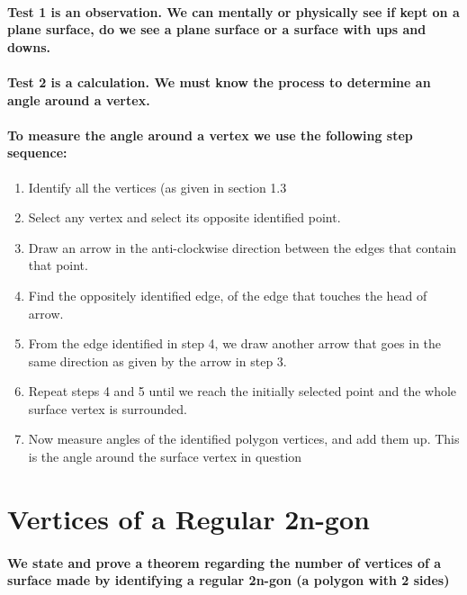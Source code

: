 \documentclass{report}
\begin{document}
\paragraph{Test 1 is an observation. We can mentally or physically see if kept on a plane surface, do we see a plane surface or a surface with ups and downs.}

\paragraph{Test 2 is a calculation. We must know the process to determine an angle around a vertex.}

\paragraph{To measure the angle around a vertex we use the following step sequence:}

\begin{enumerate}
\item  {Identify all the vertices (as given in section 1.3}

\item  {Select any vertex and select its opposite identified point.}

\item  {Draw an arrow in the anti-clockwise direction between the edges that contain that point.}

\item  {Find the oppositely identified edge, of the edge that touches the head of arrow.}

\item  {From the edge identified in step 4, we draw another arrow that goes in the same direction as given by the arrow in step 3.}

\item  {Repeat steps 4 and 5 until we reach the initially selected point and the whole surface vertex is surrounded.}

\item  {Now measure angles of the identified polygon vertices, and add them up. This is the angle around the surface vertex in question}
\end{enumerate}


\section{Vertices of a Regular 2n-gon}

\paragraph{We state and prove a theorem regarding the number of vertices of a surface made by identifying a regular 2n-gon (a polygon with 2 sides)}
\end{document}
